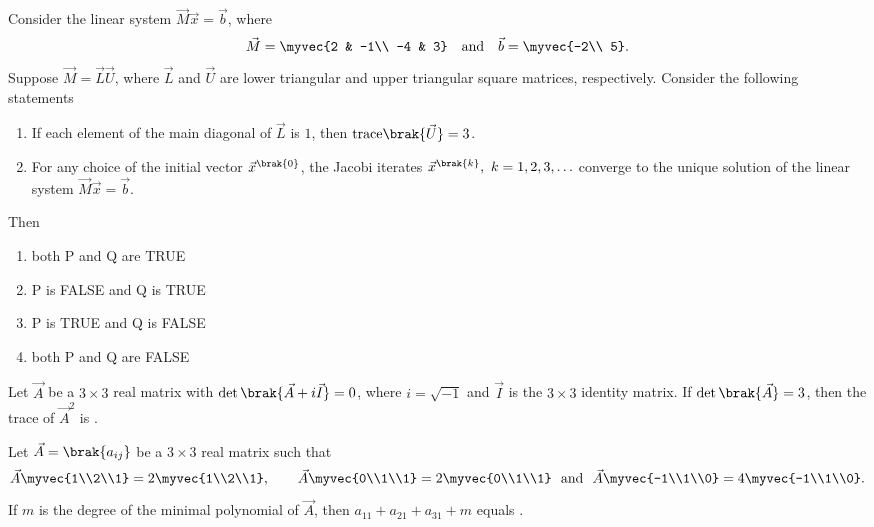 \hfill{}
\item Consider the linear system $\vec{M}\vec{x}=\vec{b}$, where 
\[
\vec{M}=\myvec{2 & -1\\ -4 & 3} \quad \text{and} \quad \vec{b}=\myvec{-2\\ 5}.
\]
Suppose $\vec{M}=\vec{L}\vec{U}$, where $\vec{L}$ and $\vec{U}$ are lower triangular and upper triangular square matrices, respectively. Consider the following statements
\begin{enumerate}[label=\Alph*:,start=16]
	\item  If each element of the main diagonal of $\vec{L}$ is $1$, then $\text{trace}\brak{\vec{U}}=3$.
	\item  For any choice of the initial vector $\vec{x}^{\brak{0}}$, the Jacobi iterates $\vec{x}^{\brak{k}},\ k=1,2,3,\ldots$ converge to the unique solution of the linear system $\vec{M}\vec{x}=\vec{b}$.
\end{enumerate}
Then
\hfill{}
\begin{multicols}{2}
\begin{enumerate}
\item both P and Q are TRUE
\item P is FALSE and Q is TRUE
\item P is TRUE and Q is FALSE
\item both P and Q are FALSE
\end{enumerate}
\end{multicols}
\item Let $\vec{A}$ be a $3\times 3$ real matrix with $\det\brak{\vec{A}+i\vec{I}}=0$, where $i=\sqrt{-1}$ and $\vec{I}$ is the $3\times 3$ identity matrix. If $\det\brak{\vec{A}}=3$, then the trace of $\vec{A}^{2}$ is \underline{\hspace{2cm}}.
\hfill{}
\item Let $\vec{A}=\brak{a_{ij}}$ be a $3\times 3$ real matrix such that
\[
\vec{A}\myvec{1\\2\\1}=2\myvec{1\\2\\1},\qquad
\vec{A}\myvec{0\\1\\1}=2\myvec{0\\1\\1}\ \text{ and }\ 
\vec{A}\myvec{-1\\1\\0}=4\myvec{-1\\1\\0}.
\]
If $m$ is the degree of the minimal polynomial of $\vec{A}$, then $a_{11}+a_{21}+a_{31}+m$ equals \underline{\hspace{2cm}}.
\hfill{\brak{\text{MA 2023}}}

